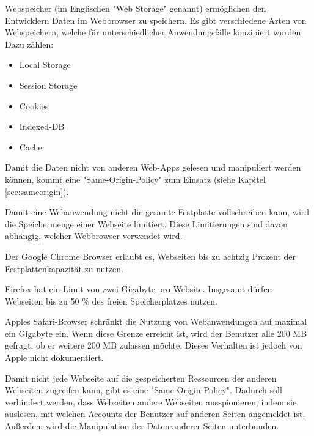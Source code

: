 \label{sec:webstorage}


Webspeicher (im Englischen "Web Storage" genannt) ermöglichen den Entwicklern %
Daten im Webbrowser zu speichern.
Es gibt verschiedene Arten von Webspeichern, welche für unterschiedlicher Anwendungsfälle konzipiert wurden. Dazu zählen:

\begin{itemize}
    \item Local Storage
    \item Session Storage
    \item Cookies
    \item Indexed-DB
    \item Cache
\end{itemize}

Damit die Daten nicht von anderen Web-Apps gelesen und manipuliert werden können, kommt eine  "Same-Origin-Policy" zum Einsatz (siehe Kapitel \ref{sec:sameorigin}).


Damit eine Webanwendung nicht die gesamte Festplatte vollschreiben kann, wird die Speichermenge einer Webseite limitiert. Diese Limitierungen sind davon abhängig, welcher Webbrowser verwendet wird.

Der Google Chrome Browser erlaubt es, Webseiten bis zu achtzig Prozent der Fest\-platten\-kapazität zu nutzen.

Firefox hat ein Limit von zwei Gigabyte pro Website. Insgesamt dürfen Webseiten bis zu 50 \% des freien Speicherplatzes nutzen.

Apples Safari-Browser schränkt die Nutzung von Webanwendungen auf maximal ein Gigabyte ein. Wenn diese Grenze erreicht ist, wird der Benutzer alle 200 MB gefragt, ob er weitere 200 MB zulassen möchte. Dieses Verhalten ist jedoch von Apple nicht dokumentiert. \cite{WebDevStorage}

 \label{sec:sameorigin}

Damit nicht jede Webseite auf die gespeicherten Ressourcen der anderen Webseiten zugreifen kann, gibt es eine "Same-Origin-Policy".
Dadurch soll verhindert werden, dass Webseiten andere Webseiten ausspionieren, indem sie auslesen, mit welchen Accounts der Benutzer auf anderen Seiten angemeldet ist. Außerdem wird die Manipulation der Daten anderer Seiten unterbunden. \cite{MDNSame-origin-policy}

